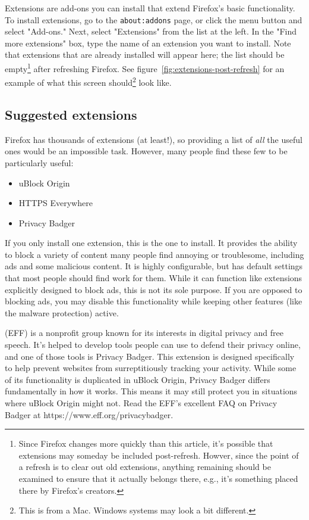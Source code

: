 \documentclass{tufte-handout}
\begin{document}
Extensions are add-ons you can install that extend Firefox's basic functionality.  To install extensions, go to the \texttt{about:addons} page, or click the menu button and select "Add-ons."  Next, select "Extensions" from the list at the left.  In the "Find more extensions" box, type the name of an extension you want to install.  Note that extensions that are already installed will appear here; the list should be empty\footnote{Since Firefox changes more quickly than this article, it's possible that extensions may someday be included post-refresh.  Howver, since the point of a refresh is to clear out old extensions, anything remaining should be examined to ensure that it actually belongs there, e.g., it's something placed there by Firefox's creators.} after refreshing Firefox.  See figure~\ref{fig:extensions-post-refresh} for an example of what this screen should\footnote{This is from a Mac.  Windows systems may look a bit different.} look like.




\subsection{Suggested extensions}
Firefox has thousands of extensions (at least!), so providing a list of \emph{all} the useful ones would be an impossible task.  However, many people find these few to be particularly useful:

\begin{itemize}
	\item uBlock Origin
	\item HTTPS Everywhere
	\item Privacy Badger
\end{itemize}


  If you only install one extension, this is the one to install.  It provides the ability to block a variety of content many people find annoying or troublesome, including ads and some malicious content.  It is highly configurable, but has default settings that most people should find work for them.  While it can function like extensions explicitly designed to block ads, this is not its sole purpose.  If you are  opposed to blocking ads, you may disable this functionality while keeping other features (like the malware protection) active.

 


 (EFF) is a nonprofit group known for its interests in digital privacy and free speech.  It's helped to develop tools people can use to defend their privacy online, and one of those tools is Privacy Badger.  This extension is designed specifically to help prevent websites from surreptitiously tracking your activity.  While some of its functionality is duplicated in uBlock Origin, Privacy Badger differs fundamentally in how it works.  This means it may still protect you in situations where uBlock Origin might not.  Read the EFF's excellent FAQ on Privacy Badger at https://www.eff.org/privacybadger.
\end{document}
